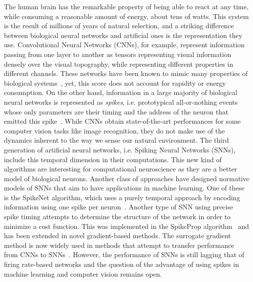 \documentclass[default]{sn-jnl}%
\theoremstyle{thmstyleone}%
\theoremstyle{thmstyletwo}%
\theoremstyle{thmstylethree}%
\begin{document}
The human brain has the remarkable property of being able to react at any time, while consuming a reasonable amount of energy, about tens of watts. This system is the result of millions of years of natural selection, and a striking difference between biological neural networks and artificial ones is the representation they use. Convolutional Neural Networks (CNNs), for example, represent information passing from one layer to another as tensors representing visual information densely over the visual topography, while representing different properties in different channels. These networks have been known to mimic many properties of biological systems~\citep{schrimpf_brain-score_2020}, yet, this score does not account for rapidity or energy consumption. On the other hand, information in a large majority of biological neural networks is represented as \emph{spikes}, i.e. prototypical all-or-nothing events whose only parameters are their timing and the address of the neuron that emitted this spike~\citep{paugam-moisy_computing_2012}. While CNNs obtain state-of-the-art performances for some computer vision tasks like image recognition, they do not make use of the dynamics inherent to the way we sense our natural environment. The third generation of artificial neural networks, i.e. Spiking Neural Networks (SNNs), include this temporal dimension in their computations. This new kind of algorithms are interesting for computational neuroscience as they are a better model of biological neurons. Another class of approaches have designed normative models of SNNs that aim to have applications in machine learning. One of these is the SpikeNet algorithm, which uses a purely temporal approach by encoding information using one spike per neuron~\citep{delorme_spikenet_1999}. Another type of SNN using precise spike timing attempts to determine the structure of the network in order to minimize a cost function. This was implemented in the SpikeProp algorithm~\citep{bohte_error-backpropagation_2002} and has been extended in novel gradient-based methods. The surrogate gradient method is now widely used in methods that attempt to transfer performance from CNNs to SNNs~\citep{zenke_remarkable_2021}. However, the performance of SNNs is still lagging that of firing rate-based networks and the question of the advantage of using spikes in machine learning and computer vision remains open.
\end{document}
